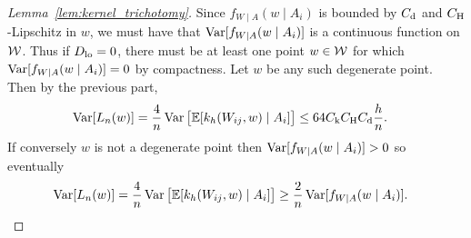 \begin{proof}[Lemma~\ref{lem:kernel_trichotomy}]

  Since $f_{W \mid A}(w \mid A_i)$
  is bounded by $C_{\mathrm{d}}$ and $C_{\mathrm{H}}$-Lipschitz in $w$,
  we must have that
  $\operatorname{Var}[f_{W \mid A}(w \mid A_i)]$
  is a continuous function on $\mathcal{W}$.
  Thus if $D_{\textup{lo}} = 0$,
  there must be at least one point $w \in \mathcal{W}$
  for which
  $\operatorname{Var}[f_{W \mid A}(w \mid A_i)] = 0$
  by compactness.
  Let $w$ be any such degenerate point.
  Then by the previous part,
  \begin{align*}
    \operatorname{Var}[L_n(w)] =
    \frac{4}{n} \operatorname{Var}\big[\mathbb{E}[k_h(W_{i j},w) \mid A_i]\big]
    &\leq
    64 C_{\mathrm{k}} C_{\mathrm{H}} C_{\mathrm{d}} \frac{h}{n}.
  \end{align*}
  If conversely $w$ is not a degenerate point
  then
  $\operatorname{Var}[f_{W \mid A}(w \mid A_i)] > 0$
  so eventually
  \begin{align*}
    \operatorname{Var}[L_n(w)]
    = \frac{4}{n}
    \operatorname{Var}\big[\mathbb{E}[k_h(W_{i j},w) \mid A_i]\big]
    &\geq
    \frac{2}{n}
    \operatorname{Var}[f_{W \mid A}(w \mid A_i)].
  \end{align*}
\end{proof}

